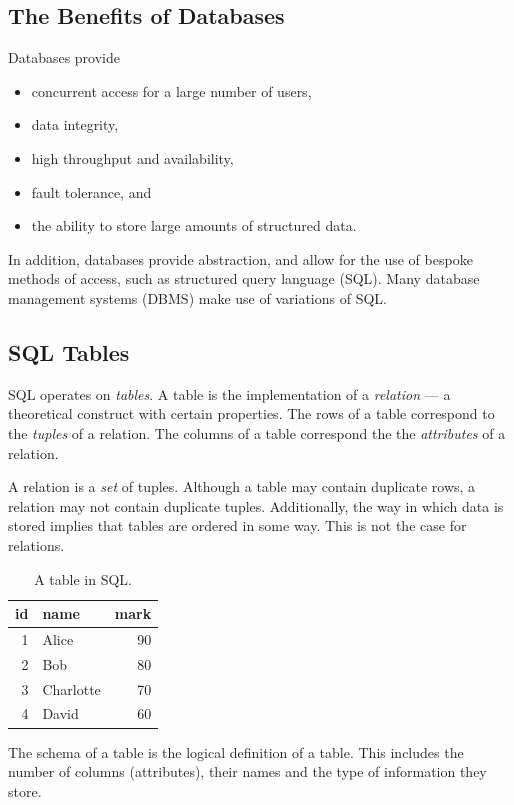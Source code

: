 \subsection{The Benefits of Databases}

Databases provide
\begin{itemize}
  \item concurrent access for a large number of users,
  \item data integrity,
  \item high throughput and availability,
  \item fault tolerance, and
  \item the ability to store large amounts of structured data.
\end{itemize}

In addition, databases provide abstraction, and allow for the use of bespoke methods of access, such as structured query language (SQL).
Many database management systems (DBMS) make use of variations of SQL.

\subsection{SQL Tables}

SQL operates on \emph{tables}.
A table is the implementation of a \emph{relation} --- a theoretical construct with certain properties.
The rows of a table correspond to the \emph{tuples} of a relation.
The columns of a table correspond the the \emph{attributes} of a relation.

A relation is a \emph{set} of tuples.
Although a table may contain duplicate rows, a relation may not contain duplicate tuples.
Additionally, the way in which data is stored implies that tables are ordered in some way.
This is not the case for relations.

\begin{table}[htp]
  \centering
  \caption*{A table in SQL.}
  \begin{tabular}{rlr}
    \toprule
    id & name & mark \\
    \midrule
    1 & Alice & 90 \\
    2 & Bob & 80 \\
    3 & Charlotte & 70 \\
    4 & David & 60 \\
    \bottomrule
  \end{tabular}
\end{table}

The schema of a table is the logical definition of a table.
This includes the number of columns (attributes), their names and the type of information they store.

